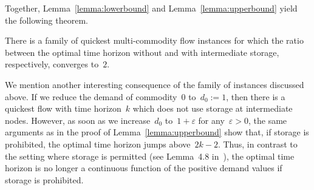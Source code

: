 \documentclass[number]{llncs}
\begin{document}
Together, Lemma~\ref{lemma:lowerbound} and Lemma~\ref{lemma:upperbound} yield the following theorem.
 
\begin{theorem}
There is a family of quickest multi-commodity flow instances for which the ratio between the optimal time horizon without and with intermediate storage, respectively, converges to~$2$.
\end{theorem}

We mention another interesting consequence of the family of instances discussed above. If we reduce the demand of commodity~$0$ to~$d_0:=1$, then there is a quickest flow with time horizon~$k$ which does not use storage at intermediate nodes. However, as soon as we increase~$d_0$ to~$1+\varepsilon$ for any~$\varepsilon>0$, the same arguments as in the proof of Lemma~\ref{lemma:upperbound} show that, if storage is prohibited, the optimal time horizon jumps above~$2k-2$. Thus, in contrast to the setting where storage is permitted (see Lemma~4.8 in~\cite{FleischerSkutella07}), the optimal time horizon is no longer a continuous function of the positive demand values if storage is prohibited.

 
 
\end{document}
